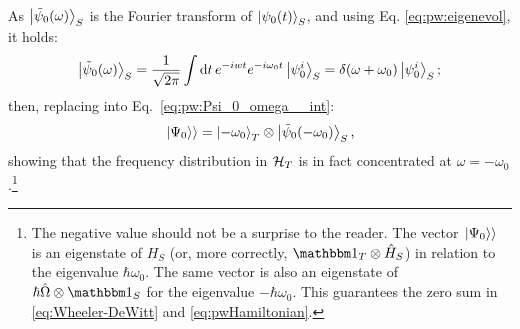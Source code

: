 As $\ket{\tilde{\psi}_{0}(\omega)}_{S}$ is the Fourier transform of $\ket{\psi_0(t)}_S$, and using Eq. \eqref{eq:pw:eigenevol}, it holds:
\[
  \ket{\tilde{\psi}_0(\omega)}_S = \frac{1}{\sqrt{2\pi}} \int \dd{t} e^{-iwt} e^{-i\omega_{0}t} \ket{\psi_0^i}_S
  = \delta(\omega+\omega_0)\ket{\psi_0^i}_S \text{;}
\]
then, replacing into Eq.~\eqref{eq:pw:Psi_0_omega__int}:
\begin{equation}\label{eq:pw:Psi_0_omega}
  \left.\left| \Psi_0 \right\rangle\right\rangle = \ket{-\omega_0}_{T}\otimes\ket{\tilde{\psi}_{0}(-\omega_0)}_{S} \text{,}
\end{equation}
%
showing that the frequency distribution in $\mathcal{H}_T$ is in fact concentrated at $\omega = -\omega_0$.\footnote{The
  negative value should not be a surprise to the reader.
  The vector $\left.\left| \Psi_0 \right\rangle\right\rangle$ is an eigenstate of $H_S$ (or, more correctly, $\idop_T \ox \op{H}_S$)
  in relation to the eigenvalue $\hbar\omega_0$.
  The same vector is also
  an eigenstate of $\hbar\op{\Omega} \ox \idop_S$ for the eigenvalue $-\hbar\omega_0$.
  This guarantees the zero sum in \eqref{eq:Wheeler-DeWitt} and \eqref{eq:pwHamiltonian}.
}




